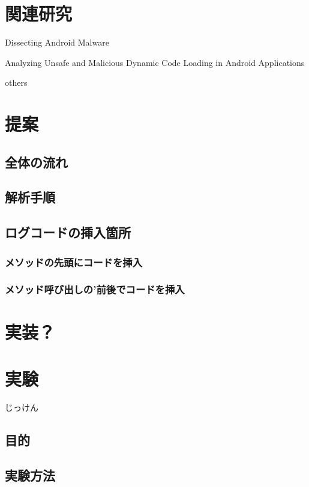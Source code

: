 \documentclass[12pt]{jsarticle}
\begin{document}
\newpage
\section{関連研究}

Dissecting Android Malware

Analyzing Unsafe and Malicious Dynamic Code Loading in Android Applications

others

\newpage
\section{提案}

\subsection{全体の流れ}

\subsection{解析手順}

\subsection{ログコードの挿入箇所}

\subsubsection{メソッドの先頭にコードを挿入}
 
\subsubsection{メソッド呼び出しの’前後でコードを挿入}
 
\newpage
\section{実装？}

\newpage
\section{実験}
\label{sec:exp}
じっけん
\subsection{目的}

\subsection{実験方法}
\end{document}
